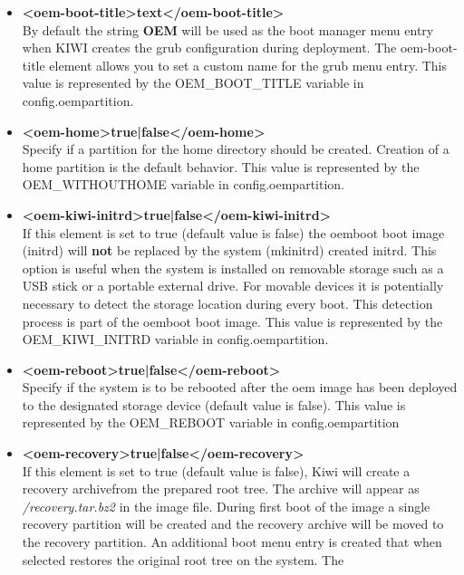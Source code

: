 \begin{itemize}
	\begin{itemize}
    \item \textbf{<oem-boot-title>text</oem-boot-title>}\\
       By default the string \textbf{OEM} will be used as the boot manager 
       menu entry when KIWI creates the grub configuration during
       deployment. The oem-boot-title element allows you to set a custom
       name for the grub menu entry. This value is represented by the
       OEM\_BOOT\_TITLE variable in config.oempartition.
	\item \textbf{<oem-home>true|false</oem-home>}\\
       Specify if a partition for the home directory should be created.
       Creation of a home partition is the default behavior. This value is 
       represented by the OEM\_WITHOUTHOME variable in config.oempartition.
	\item \textbf{<oem-kiwi-initrd>true|false</oem-kiwi-initrd>}\\
       If this element is set to true (default value is false) the oemboot 
       boot image (initrd) will \textbf{not} be replaced by the system 
       (mkinitrd) created initrd. This option is useful when the system
       is installed on removable storage such as a USB stick or a portable
       external drive. For movable devices it is potentially necessary to 
       detect the storage location during every boot. This detection
       process is part of the oemboot boot image. This value is represented
       by the OEM\_KIWI\_INITRD variable in config.oempartition.
	\item \textbf{<oem-reboot>true|false</oem-reboot>}\\
       Specify if the system is to be rebooted after the oem image has been
       deployed to the designated storage device (default value is false). 
       This value is represented by the OEM\_REBOOT variable in 
       config.oempartition
	\item \textbf{<oem-recovery>true|false</oem-recovery>}\\
      If this element is set to true (default value is false), Kiwi will
      create a recovery archivefrom the prepared root tree. The archive will 
      appear as \textit{/recovery.tar.bz2} in the image file. During 
      first boot of the image a single recovery partition will be
      created and the recovery archive will be moved to the recovery 
      partition. An additional boot menu entry is created that when selected
      restores the original root tree on the system. The

\end{itemize}
\end{itemize}
